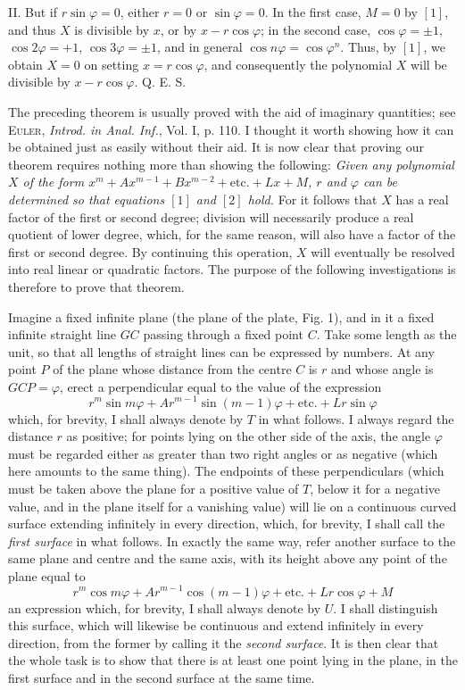 II. But if $r\sin\varphi=0$, either $r=0$ or $\sin\varphi=0$. In the first case, $M=0$ by $[1]$, and thus $X$ is divisible by $x$, or by $x-r\cos\varphi$; in the second case, $\cos\varphi=\pm1$, $\cos2\varphi=+1$, $\cos3\varphi=\pm1$, and in general $\cos n\varphi=\cos\varphi^n$. Thus, by $[1]$, we obtain $X=0$ on setting $x=r\cos\varphi$, and consequently the polynomial $X$ will be divisible by $x-r\cos\varphi$. Q. E. S.

The preceding theorem is usually proved with the aid of imaginary quantities; see \textsc{Euler}, \textit{Introd. in Anal. Inf.}, Vol. I, p. 110. I thought it worth showing how it can be obtained just as easily without their aid. It is now clear that proving our theorem requires nothing more than showing the following: \textit{Given any polynomial $X$ of the form $x^m+Ax^{m-1}+Bx^{m-2}+\text{etc.}+Lx+M$, $r$ and $\varphi$ can be determined so that equations $[1]$ and $[2]$ hold.} For it follows that $X$ has a real factor of the first or second degree; division will necessarily produce a real quotient of lower degree, which, for the same reason, will also have a factor of the first or second degree. By continuing this operation, $X$ will eventually be resolved into real linear or quadratic factors. The purpose of the following investigations is therefore to prove that theorem.

Imagine a fixed infinite plane (the plane of the plate, Fig. 1), and in it a fixed infinite straight line $GC$ passing through a fixed point $C$. Take some length as the unit, so that all lengths of straight lines can be expressed by numbers. At any point $P$ of the plane whose distance from the centre $C$ is $r$ and whose angle is $GCP=\varphi$, erect a perpendicular equal to the value of the expression
\[
r^m\sin m\varphi+Ar^{m-1}\sin(m-1)\varphi+\text{etc.}+Lr\sin\varphi
\]
which, for brevity, I shall always denote by $T$ in what follows. I always regard the distance $r$ as positive; for points lying on the other side of the axis, the angle $\varphi$ must be regarded either as greater than two right angles or as negative (which here amounts to the same thing). The endpoints of these perpendiculars (which must be taken above the plane for a positive value of $T$, below it for a negative value, and in the plane itself for a vanishing value) will lie on a continuous curved surface extending infinitely in every direction, which, for brevity, I shall call the \textit{first surface} in what follows. In exactly the same way, refer another surface to the same plane and centre and the same axis, with its height above any point of the plane equal to
\[
r^m\cos m\varphi+Ar^{m-1}\cos(m-1)\varphi+\text{etc.}+Lr\cos\varphi+M
\]
an expression which, for brevity, I shall always denote by $U$. I shall distinguish this surface, which will likewise be continuous and extend infinitely in every direction, from the former by calling it the
\textit{second surface}. It is then clear that the whole task is to show that there is at least one point lying in the plane, in the first surface and in the second surface at the same time.

